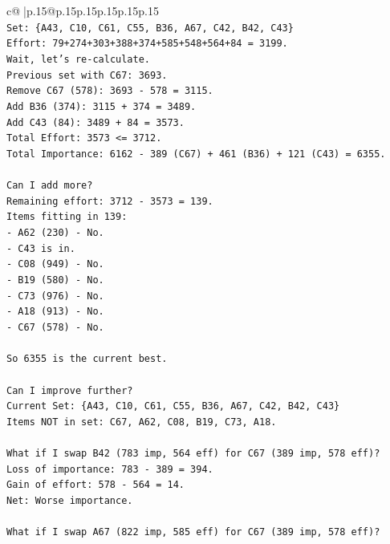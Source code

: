 \documentclass{article}
\begin{document}
{\begin{supertabular}{c@{$\;$}|p{.15\linewidth}@{}p{.15\linewidth}p{.15\linewidth}p{.15\linewidth}p{.15\linewidth}p{.15\linewidth}}
{{{\\ 
\texttt{Set: \{A43, C10, C61, C55, B36, A67, C42, B42, C43\}} \\
\texttt{Effort: 79+274+303+388+374+585+548+564+84 = 3199.} \\
\texttt{Wait, let's re{-}calculate.} \\
\texttt{Previous set with C67: 3693.} \\
\texttt{Remove C67 (578): 3693 {-} 578 = 3115.} \\
\texttt{Add B36 (374): 3115 + 374 = 3489.} \\
\texttt{Add C43 (84): 3489 + 84 = 3573.} \\
\texttt{Total Effort: 3573 <= 3712.} \\
\texttt{Total Importance: 6162 {-} 389 (C67) + 461 (B36) + 121 (C43) = 6355.} \\
\\ 
\texttt{Can I add more?} \\
\texttt{Remaining effort: 3712 {-} 3573 = 139.} \\
\texttt{Items fitting in 139:} \\
\texttt{{-} A62 (230) {-} No.} \\
\texttt{{-} C43 is in.} \\
\texttt{{-} C08 (949) {-} No.} \\
\texttt{{-} B19 (580) {-} No.} \\
\texttt{{-} C73 (976) {-} No.} \\
\texttt{{-} A18 (913) {-} No.} \\
\texttt{{-} C67 (578) {-} No.} \\
\\ 
\texttt{So 6355 is the current best.} \\
\\ 
\texttt{Can I improve further?} \\
\texttt{Current Set: \{A43, C10, C61, C55, B36, A67, C42, B42, C43\}} \\
\texttt{Items NOT in set: C67, A62, C08, B19, C73, A18.} \\
\\ 
\texttt{What if I swap B42 (783 imp, 564 eff) for C67 (389 imp, 578 eff)?} \\
\texttt{Loss of importance: 783 {-} 389 = 394.} \\
\texttt{Gain of effort: 578 {-} 564 = 14.} \\
\texttt{Net: Worse importance.} \\
\\ 
\texttt{What if I swap A67 (822 imp, 585 eff) for C67 (389 imp, 578 eff)?} \\
}}}
\end{supertabular}}
\end{document}
